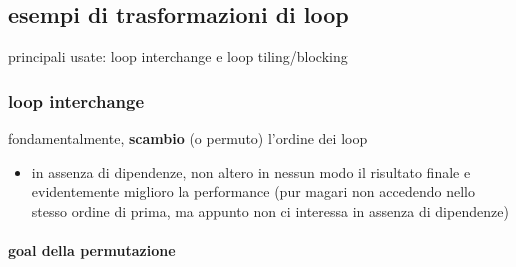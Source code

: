 \subsection{esempi di trasformazioni di loop}

principali usate: loop interchange e loop tiling/blocking

\subsubsection{loop interchange}

fondamentalmente, \textbf{scambio} (o permuto) l'ordine dei loop
\begin{itemize}
  \item in assenza di dipendenze, non altero in nessun modo il risultato finale e evidentemente miglioro la performance (pur magari non accedendo nello stesso ordine di prima, ma appunto non ci interessa in assenza di dipendenze)
\end{itemize}

\paragraph{goal della permutazione}~\\

